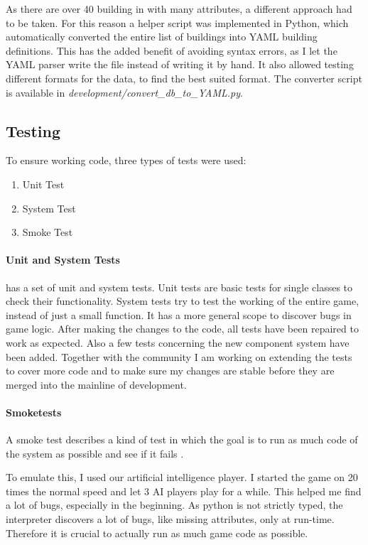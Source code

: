 As there are over 40 building in \UH{} with many attributes, a different approach had to be taken. For this reason a
helper script was implemented in Python, which automatically converted the entire list of buildings into YAML building
definitions. This has the added benefit of avoiding syntax errors, as I let the YAML parser write the file instead of
writing it by hand. It also allowed testing different formats for the data, to find the best suited format. The
converter script is available in \textit{development/convert\_db\_to\_YAML.py}.

\subsection{Testing}
To ensure working code, three types of tests were used:
\begin{enumerate}
    \item Unit Test
    \item System Test
    \item Smoke Test
\end{enumerate}

\paragraph{Unit and System Tests}
\UH{} has a set of unit and system tests. Unit tests are basic tests for single classes to check their functionality.
System tests try to test the working of the entire game, instead of just a small function. It has a more general scope
to discover bugs in game logic.
After making the changes to the code, all tests have been repaired to work as expected. Also a few tests concerning the
new component system have been added. Together with the community I am working on extending the tests to cover more code
and to make sure my changes are stable before they are merged into the mainline of development.

\paragraph{Smoketests}
A smoke test describes a kind of test in which the goal is to run as much code of the system as possible and see if it
fails \cite{Mcconnell:1996:DBS:624614.625626}.

To emulate this, I used our artificial intelligence player. I started the game on 20 times the normal speed and
let 3 AI players play for a while. This helped me find a lot of bugs, especially in the beginning. As python is not
strictly typed, the interpreter discovers a lot of bugs, like missing attributes, only at run-time. Therefore it is
crucial to actually run as much game code as possible.

